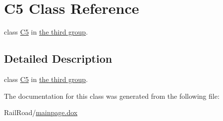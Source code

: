 \hypertarget{class_c5}{\section{C5 Class Reference}
\label{class_c5}
}


class \hyperlink{class_c5}{C5} in \hyperlink{group__group3}{the third group}.  




\subsection{Detailed Description}
class \hyperlink{class_c5}{C5} in \hyperlink{group__group3}{the third group}. 

The documentation for this class was generated from the following file\-:\begin{DoxyCompactItemize}
\item 
Rail\-Road/\hyperlink{mainpage_8dox}{mainpage.\-dox}\end{DoxyCompactItemize}

